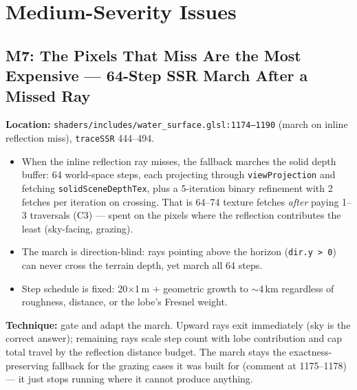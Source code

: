\documentclass[11pt,a4paper]{article}
\begin{document}
\section{Medium-Severity Issues}

\subsection{M7: The Pixels That Miss Are the Most Expensive --- 64-Step SSR March After a Missed Ray}

\textbf{Location:} \texttt{shaders/includes/water\_surface.glsl:1174--1190} (march on inline reflection miss), \texttt{traceSSR} 444--494.

\begin{itemize}
    \item When the inline reflection ray misses, the fallback marches the solid depth buffer: 64 world-space steps, each projecting through \texttt{viewProjection} and fetching \texttt{solidSceneDepthTex}, plus a 5-iteration binary refinement with 2 fetches per iteration on crossing. That is 64--74 texture fetches \emph{after} paying 1--3 traversals (C3) --- spent on the pixels where the reflection contributes the least (sky-facing, grazing).
    \item The march is direction-blind: rays pointing above the horizon (\texttt{dir.y > 0}) can never cross the terrain depth, yet march all 64 steps.
    \item Step schedule is fixed: 20$\times$1\,m $+$ geometric growth to $\sim$4\,km regardless of roughness, distance, or the lobe's Fresnel weight.
\end{itemize}

\textbf{Technique:} gate and adapt the march. Upward rays exit immediately (sky is the correct answer); remaining rays scale step count with lobe contribution and cap total travel by the reflection distance budget. The march stays the exactness-preserving fallback for the grazing cases it was built for (comment at 1175--1178) --- it just stops running where it cannot produce anything.
\end{document}
